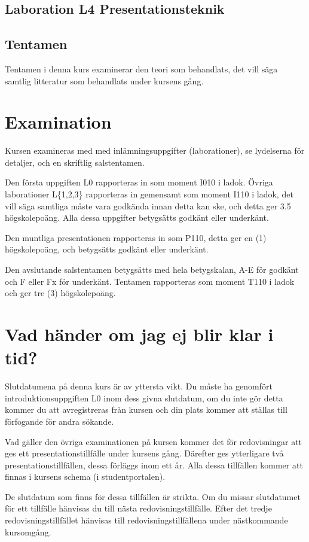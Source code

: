 \documentclass[a4paper,logo]{miunart}
\begin{document}
\subsection{Laboration L4 Presentationsteknik}


\subsection{Tentamen}
Tentamen i denna kurs examinerar den teori som behandlats, det vill säga 
samtlig litteratur som behandlats under kursens gång.


\section{Examination}
\label{sec:exam}
Kursen examineras med med inlämningsuppgifter (laborationer), se lydelserna för 
detaljer, och en skriftlig salstentamen.

Den första uppgiften L0 rapporteras in som moment I010 i ladok.
Övriga laborationer L\{1,2,3\} rapporteras in gemensamt som moment I110 
i ladok, det vill säga samtliga måste vara godkända innan detta kan ske, och 
detta ger 3.5 högskolepoäng.
Alla dessa uppgifter betygsätts godkänt eller underkänt.

Den muntliga presentationen rapporteras in som P110, detta ger en (1) 
högskolepoäng, och betygsätts godkänt eller underkänt.

Den avslutande salstentamen betygsätts med hela betygskalan, A-E för godkänt 
och F eller Fx för underkänt.
Tentamen rapporteras som moment T110 i ladok och ger tre (3) högskolepoäng.


\section{Vad händer om jag ej blir klar i tid?}
\label{sec:late}
Slutdatumena på denna kurs är av yttersta vikt.
Du måste ha genomfört introduktionsuppgiften L0 inom dess givna slutdatum, om 
du inte gör detta kommer du att avregistreras från kursen och din plats kommer 
att ställas till förfogande för andra sökande.

Vad gäller den övriga examinationen på kursen kommer det för redovisningar att 
ges ett presentationstillfälle under kursens gång.
Därefter ges ytterligare två presentationstillfällen, dessa förläggs inom ett 
år.
Alla dessa tillfällen kommer att finnas i kursens schema (i studentportalen).

De slutdatum som finns för dessa tillfällen är strikta.
Om du missar slutdatumet för ett tillfälle hänvisas du till nästa 
redovisningstillfälle.
Efter det tredje redovisningstillfället hänvisas till redovisningstillfällena 
under nästkommande kursomgång.
\end{document}
